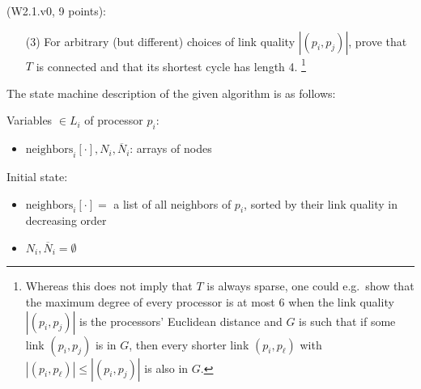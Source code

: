 \begin{Exc}{(W2.1.v0, 9 points):}
\begin{enumerate}
\item[(3)] For arbitrary (but different) choices of link quality
$|(p_i,p_j)|$, prove that $T$ is connected and that its shortest
cycle has length 4.
\footnote{Whereas this does not imply that $T$ is always sparse,
one could e.g.\ show that the maximum degree of every processor is at
most 6 when the link quality $|(p_i,p_j)|$ is the processors' Euclidean
distance and $G$ is such that if some link $(p_i,p_j)$ is
in $G$, then every shorter link $(p_i,p_\ell)$ with $|(p_i,p_\ell)|
\leq |(p_i,p_j)|$ is also in $G$.}
\end{enumerate}
\end{Exc}

The state machine description of the given algorithm is as follows:

Variables $\in L_i$ of processor $p_i$:
\begin{itemize}
\item $\text{neighbors}_i[\cdot], N_i, \overline{N}_i$: arrays of nodes
\end{itemize}

Initial state:
\begin{itemize}
\item $\text{neighbors}_i[\cdot] = $ a list of all neighbors of $p_i$, sorted by their
      link quality in decreasing order
\item $N_i, \overline{N}_i = \emptyset$
\end{itemize}

